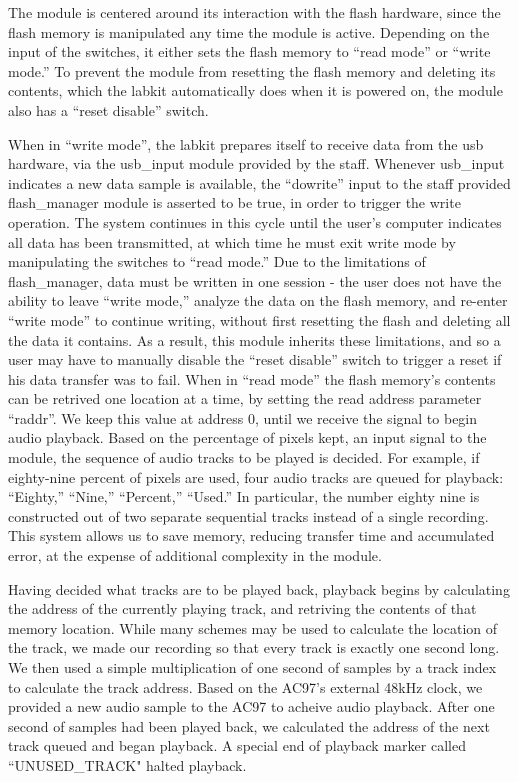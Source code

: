 \documentclass{article}
\begin{document}
The module is centered around its interaction with the flash hardware, since the flash memory is manipulated any time the module is active.
Depending on the input of the switches, it either sets the flash memory to ``read mode''  or ``write mode.''
To prevent the module from resetting the flash memory and deleting its contents, which the labkit automatically does when it is powered on,
the module also has a ``reset disable'' switch.

When in ``write mode'', the labkit prepares itself to receive data from the usb hardware, via the usb\_input module provided by the staff.
Whenever usb\_input indicates a new data sample is available, the ``dowrite'' input to the staff provided flash\_manager module is asserted to be true, in order to trigger the write operation.
The system continues in this cycle until the user's computer indicates all data has been transmitted,
at which time he must exit write mode by manipulating the switches to ``read mode.''
Due to the limitations of flash\_manager, data must be written in one session - the user does not have the ability to leave ``write mode,''
analyze the data on the flash memory, and re-enter ``write mode'' to continue writing, without first resetting the flash and deleting all the data it contains.
As a result, this module inherits these limitations, and so a user may have to manually disable the ``reset disable'' switch to trigger a reset if his data transfer was to fail.
When in ``read mode'' the flash memory's contents can be retrived one location at a time, by setting the read address parameter ``raddr''.
We keep this value at address 0, until we receive the signal to begin audio playback.
Based on the percentage of pixels kept, an input signal to the module, the sequence of audio tracks to be played is decided.
For example, if eighty-nine percent of pixels are used, four audio tracks are queued for playback: ``Eighty,'' ``Nine,'' ``Percent,'' ``Used.''
In particular, the number eighty nine is constructed out of two separate sequential tracks instead of a single recording.
This system allows us to save memory, reducing transfer time and accumulated error, at the expense of additional complexity in the module.

Having decided what tracks are to be played back, playback begins by calculating the address of the currently playing track,
and retriving the contents of that memory location.
While many schemes may be used to calculate the location of the track, we made our recording so that every track is exactly one second long.
We then used a simple multiplication of one second of samples by a track index to calculate the track address.
Based on the AC97's external 48kHz clock, we provided a new audio sample to the AC97 to acheive audio playback.
After one second of samples had been played back, we calculated the address of the next track queued and began playback.
A special end of playback marker called ``UNUSED\_TRACK" halted playback.
\end{document}
